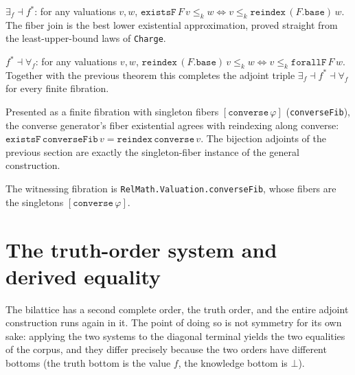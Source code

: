 \begin{theorem}\label{thm:existsF-adjunction}\leanok{}
$\exists_{f} \dashv f^{*}$: for any valuations $v, w$, $\texttt{existsF}\,F\,v
\le_k w \iff v \le_k \texttt{reindex}\,(F.\texttt{base})\,w$. The fiber join is the
best lower existential approximation, proved straight from the least-upper-bound
laws of \texttt{Charge}.
\end{theorem}

\begin{theorem}\label{thm:forallF-adjunction}\leanok{}
$f^{*} \dashv \forall_{f}$: for any valuations $v, w$,
$\texttt{reindex}\,(F.\texttt{base})\,v \le_k w \iff v \le_k
\texttt{forallF}\,F\,w$. Together with the previous theorem this completes the
adjoint triple $\exists_{f} \dashv f^{*} \dashv \forall_{f}$ for every finite
fibration.
\end{theorem}

\begin{theorem}\label{thm:existsF-converse}\leanok{}
Presented as a finite fibration with singleton fibers $[\texttt{converse}\,
\varphi]$ (\texttt{converseFib}), the converse generator's fiber existential
agrees with reindexing along converse: $\texttt{existsF}\,\texttt{converseFib}\,v
= \texttt{reindex}\,\texttt{converse}\,v$. The bijection adjoints of the previous
section are exactly the singleton-fiber instance of the general construction.
\end{theorem}

The witnessing fibration is \texttt{RelMath.Valuation.converseFib}, whose fibers
are the singletons $[\texttt{converse}\,\varphi]$.

\section{The truth-order system and derived equality}

The bilattice has a second complete order, the truth order, and the entire
adjoint construction runs again in it. The point of doing so is not symmetry for
its own sake: applying the two systems to the diagonal terminal yields the two
equalities of the corpus, and they differ precisely because the two orders have
different bottoms (the truth bottom is the value $f$, the knowledge bottom is
$\bot$).

